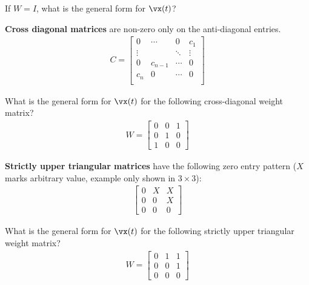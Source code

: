 \documentclass[a4paper,11pt]{exam}
\newcounter{ct}
\begin{document}
\begin{questions}
\question If $W = I$, what is the general form for $\vx(t)$?

\textbf{Cross diagonal matrices} are non-zero only on the anti-diagonal entries.
\begin{align}\label{eq:LA:cdiag}
    C
    =
    \begin{bmatrix}
	0 & \cdots & 0 & c_1\\
	\vdots & & \ddots & \vdots \\
	0 & c_{n-1} & \cdots & 0 \\
	c_n & 0 & \cdots & 0 \\
    \end{bmatrix}
\end{align}

\question What is the general form for $\vx(t)$ for the following cross-diagonal weight matrix?
\begin{align}\label{eq:LA:cdiag:eg}
    W
    =
    \begin{bmatrix}
	0 & 0 & 1 \\
	0 & 1 & 0\\
	1 & 0 & 0
    \end{bmatrix}
\end{align}

\textbf{Strictly upper triangular matrices} have the following zero entry pattern ($X$ marks arbitrary value, example only shown in $3 \times 3$):
\begin{align}\label{eq:LA:suppertri}
    \begin{bmatrix}
	0 & X & X \\
	0 & 0 & X\\
	0 & 0 & 0
    \end{bmatrix}
\end{align}

\question What is the general form for $\vx(t)$ for the following strictly upper triangular weight matrix?
\begin{align}\label{eq:LA:suppertri:eg}
    W
    =
    \begin{bmatrix}
	0 & 1 & 1 \\
	0 & 0 & 1\\
	0 & 0 & 0
    \end{bmatrix}
\end{align}


\end{questions}
\end{document}
